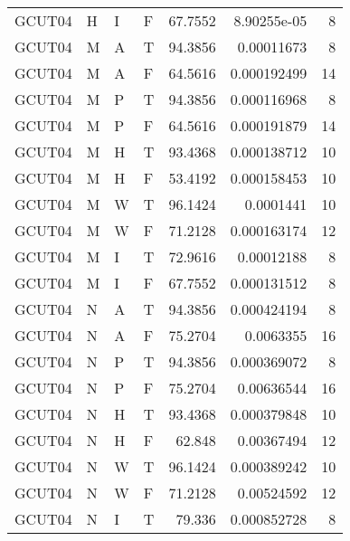 \begin{longtable}{llllrrr}
    GCUT04   & H         & I         & F          & 67.7552    & 8.90255e-05 & 8        \\
    GCUT04   & M         & A         & T          & 94.3856    & 0.00011673  & 8        \\
    GCUT04   & M         & A         & F          & 64.5616    & 0.000192499 & 14       \\
    GCUT04   & M         & P         & T          & 94.3856    & 0.000116968 & 8        \\
    GCUT04   & M         & P         & F          & 64.5616    & 0.000191879 & 14       \\
    GCUT04   & M         & H         & T          & 93.4368    & 0.000138712 & 10       \\
    GCUT04   & M         & H         & F          & 53.4192    & 0.000158453 & 10       \\
    GCUT04   & M         & W         & T          & 96.1424    & 0.0001441   & 10       \\
    GCUT04   & M         & W         & F          & 71.2128    & 0.000163174 & 12       \\
    GCUT04   & M         & I         & T          & 72.9616    & 0.00012188  & 8        \\
    GCUT04   & M         & I         & F          & 67.7552    & 0.000131512 & 8        \\
    GCUT04   & N         & A         & T          & 94.3856    & 0.000424194 & 8        \\
    GCUT04   & N         & A         & F          & 75.2704    & 0.0063355   & 16       \\
    GCUT04   & N         & P         & T          & 94.3856    & 0.000369072 & 8        \\
    GCUT04   & N         & P         & F          & 75.2704    & 0.00636544  & 16       \\
    GCUT04   & N         & H         & T          & 93.4368    & 0.000379848 & 10       \\
    GCUT04   & N         & H         & F          & 62.848     & 0.00367494  & 12       \\
    GCUT04   & N         & W         & T          & 96.1424    & 0.000389242 & 10       \\
    GCUT04   & N         & W         & F          & 71.2128    & 0.00524592  & 12       \\
    GCUT04   & N         & I         & T          & 79.336     & 0.000852728 & 8        \\

\end{longtable}
